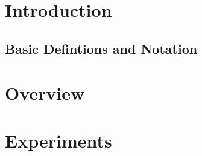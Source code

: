 \section{Introduction}
\label{sec:introduction}

\subsection{Basic Defintions and Notation}
\label{sec:basic-defint-notat}

\section{Overview}
\label{sec:overview}

\section{Experiments}
\label{sec:experiments}


